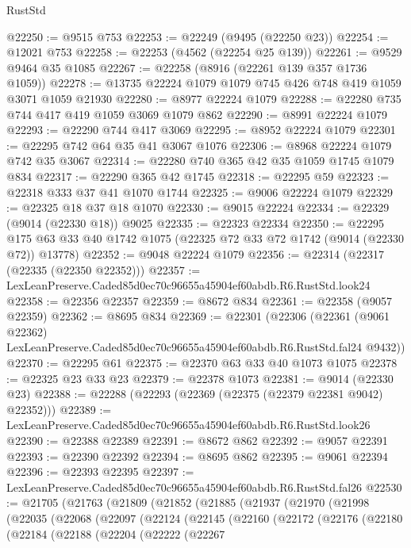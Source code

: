 \begin{lexlean}{RustStd}
\begin{coremodule}
@22250 := @9515 @753
@22253 := @22249 (@9495 (@22250 @23))
@22254 := @12021 @753
@22258 := @22253 (@4562 (@22254 @25 @139))
@22261 := @9529 @9464 @35 @1085
@22267 := @22258 (@8916 (@22261 @139 @357 @1736 @1059))
@22278 := @13735 @22224 @1079 @1079 @745 @426 @748 @419 @1059 @3071 @1059 @21930
@22280 := @8977 @22224 @1079
@22288 := @22280 @735 @744 @417 @419 @1059 @3069 @1079 @862
@22290 := @8991 @22224 @1079
@22293 := @22290 @744 @417 @3069
@22295 := @8952 @22224 @1079
@22301 := @22295 @742 @64 @35 @41 @3067 @1076
@22306 := @8968 @22224 @1079 @742 @35 @3067
@22314 := @22280 @740 @365 @42 @35 @1059 @1745 @1079 @834
@22317 := @22290 @365 @42 @1745
@22318 := @22295 @59
@22323 := @22318 @333 @37 @41 @1070 @1744
@22325 := @9006 @22224 @1079
@22329 := @22325 @18 @37 @18 @1070
@22330 := @9015 @22224
@22334 := @22329 (@9014 (@22330 @18)) @9025
@22335 := @22323 @22334
@22350 := @22295 @175 @63 @33 @40 @1742 @1075 (@22325 @72 @33 @72 @1742 (@9014 (@22330 @72)) @13778)
@22352 := @9048 @22224 @1079
@22356 := @22314 (@22317 (@22335 (@22350 @22352)))
@22357 := LexLeanPreserve.Caded85d0ec70c96655a45904ef60abdb.R6.RustStd.look24
@22358 := @22356 @22357
@22359 := @8672 @834
@22361 := @22358 (@9057 @22359)
@22362 := @8695 @834
@22369 := @22301
    (@22306
      (@22361
        (@9061 @22362)
        LexLeanPreserve.Caded85d0ec70c96655a45904ef60abdb.R6.RustStd.fal24
        @9432))
@22370 := @22295 @61
@22375 := @22370 @63 @33 @40 @1073 @1075
@22378 := @22325 @23 @33 @23
@22379 := @22378 @1073
@22381 := @9014 (@22330 @23)
@22388 := @22288 (@22293 (@22369 (@22375 (@22379 @22381 @9042) @22352)))
@22389 := LexLeanPreserve.Caded85d0ec70c96655a45904ef60abdb.R6.RustStd.look26
@22390 := @22388 @22389
@22391 := @8672 @862
@22392 := @9057 @22391
@22393 := @22390 @22392
@22394 := @8695 @862
@22395 := @9061 @22394
@22396 := @22393 @22395
@22397 := LexLeanPreserve.Caded85d0ec70c96655a45904ef60abdb.R6.RustStd.fal26
@22530 := @21705
    (@21763
      (@21809
        (@21852
          (@21885
            (@21937
              (@21970
                (@21998
                  (@22035
                    (@22068
                      (@22097
                        (@22124
                          (@22145
                            (@22160
                              (@22172
                                (@22176
                                  (@22180
                                    (@22184
                                      (@22188
                                        (@22204
                                          (@22222
                                            (@22267

\end{coremodule}
\end{lexlean}
